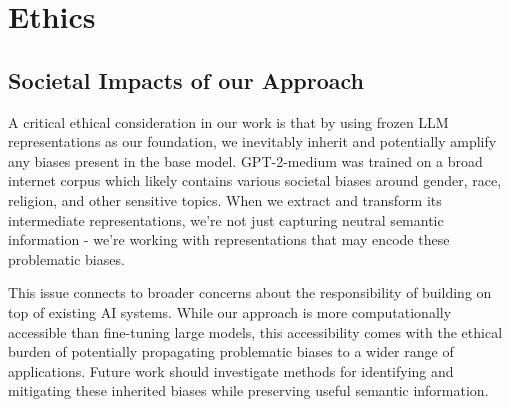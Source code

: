 \documentclass{article}
\begin{document}
\section{Ethics}

\subsection{Societal Impacts of our Approach}
A critical ethical consideration in our work is that by using frozen LLM representations as our foundation, we inevitably inherit and potentially amplify any biases present in the base model. GPT-2-medium was trained on a broad internet corpus which likely contains various societal biases around gender, race, religion, and other sensitive topics. When we extract and transform its intermediate representations, we're not just capturing neutral semantic information - we're working with representations that may encode these problematic biases.

This issue connects to broader concerns about the responsibility of building on top of existing AI systems. While our approach is more computationally accessible than fine-tuning large models, this accessibility comes with the ethical burden of potentially propagating problematic biases to a wider range of applications. Future work should investigate methods for identifying and mitigating these inherited biases while preserving useful semantic information.
\end{document}
